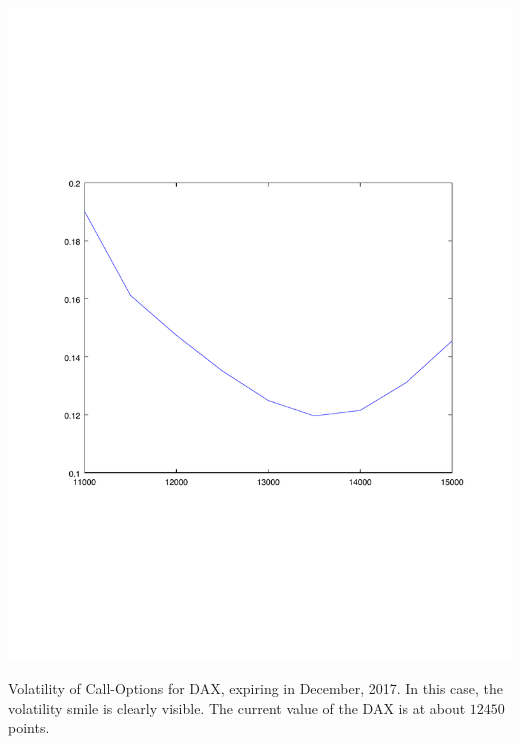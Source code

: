 \documentclass[10pt,a4paper]{article}
\begin{document}
\begin{center}
	\includegraphics[scale=0.45]{images/dax.pdf}
\end{center}

Volatility of Call-Options for DAX, expiring in December, 2017. In this case, the volatility smile is clearly visible. The current value of the DAX is at about $12450$ points. 
\end{document}
